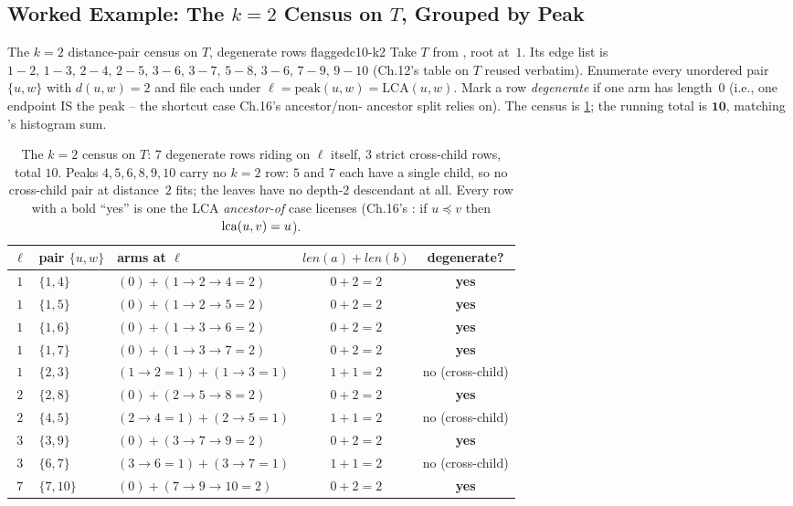 \subsection{Worked Example: The $k=2$ Census on $T$, Grouped by Peak}\label{subsec:c10-k2-census}

\begin{example}{The $k=2$ distance-pair census on $T$, degenerate rows flagged}{c10-k2}
Take $T$ from , root at~$1$. Its edge list is
$1\!-\!2,\,1\!-\!3,\,2\!-\!4,\,2\!-\!5,\,3\!-\!6,\,3\!-\!7,\,5\!-\!8,\,
3\!-\!6,\,7\!-\!9,\,9\!-\!10$ (Ch.12's  table on $T$
reused verbatim). Enumerate every unordered pair $\{u,w\}$ with $d(u,w)=2$
and file each under $\ell=\mathrm{peak}(u,w)=\mathrm{LCA}(u,w)$. Mark a
row \emph{degenerate} if one arm has length~$0$ (i.e., one endpoint IS
the peak -- the shortcut case Ch.16's  ancestor/non-
ancestor split relies on). The census is \ref{tab:c10-k2-table}; the
running total is $\mathbf{10}$, matching 's
histogram sum.
\end{example}

\begin{table}[H]
\centering
\footnotesize
\renewcommand{\arraystretch}{1.2}
\begin{tabular}{@{}c l l c c@{}}
\toprule
$\ell$ & pair $\{u,w\}$ & arms at $\ell$ & $\mathit{len}(a)+\mathit{len}(b)$ & degenerate? \\ \midrule
$1$ & $\{1,4\}$ & $(0)+(1\!\to\!2\!\to\!4=2)$ & $0+2=2$ & \textbf{yes} \\
$1$ & $\{1,5\}$ & $(0)+(1\!\to\!2\!\to\!5=2)$ & $0+2=2$ & \textbf{yes} \\
$1$ & $\{1,6\}$ & $(0)+(1\!\to\!3\!\to\!6=2)$ & $0+2=2$ & \textbf{yes} \\
$1$ & $\{1,7\}$ & $(0)+(1\!\to\!3\!\to\!7=2)$ & $0+2=2$ & \textbf{yes} \\
$1$ & $\{2,3\}$ & $(1\!\to\!2=1)+(1\!\to\!3=1)$ & $1+1=2$ & no (cross-child) \\ \midrule
$2$ & $\{2,8\}$ & $(0)+(2\!\to\!5\!\to\!8=2)$ & $0+2=2$ & \textbf{yes} \\
$2$ & $\{4,5\}$ & $(2\!\to\!4=1)+(2\!\to\!5=1)$ & $1+1=2$ & no (cross-child) \\ \midrule
$3$ & $\{3,9\}$ & $(0)+(3\!\to\!7\!\to\!9=2)$ & $0+2=2$ & \textbf{yes} \\
$3$ & $\{6,7\}$ & $(3\!\to\!6=1)+(3\!\to\!7=1)$ & $1+1=2$ & no (cross-child) \\ \midrule
$7$ & $\{7,10\}$ & $(0)+(7\!\to\!9\!\to\!10=2)$ & $0+2=2$ & \textbf{yes} \\ \bottomrule
\end{tabular}
\captionsetup{type=table}
\caption{The $k=2$ census on $T$: $7$ degenerate rows riding on $\ell$
itself, $3$ strict cross-child rows, total $10$. Peaks $4,5,6,8,9,10$
carry no $k=2$ row: $5$ and $7$ each have a single child, so no
cross-child pair at distance~$2$ fits; the leaves have no depth-$2$
descendant at all. Every row with a bold ``yes'' is one the LCA
\emph{ancestor-of} case licenses (Ch.16's : if
$u\preceq v$ then $\operatorname{lca}(u,v)=u$).}\label{tab:c10-k2-table}
\end{table}

